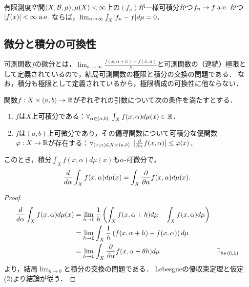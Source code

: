 \documentclass[uplatex, dvipdfmx]{jsreport}
\begin{document}
\begin{theorem}[Vitali]
    有限測度空間$(X,\mathcal{B},\mu),\mu(X)<\infty$上の$(f_n)$が一様可積分かつ$f_n\to f\;\mathrm{a.e.}\;$かつ$\lvert f(x)\rvert<\infty\;\mathrm{a.e.}\;$ならば，$\lim_{n\to\infty}\int_X\lvert f_n-f\rvert d\mu=0$．
\end{theorem}

\subsection{微分と積分の可換性}

\begin{tcolorbox}[colframe=ForestGreen, colback=ForestGreen!10!white,breakable,colbacktitle=ForestGreen!40!white,coltitle=black,fonttitle=\bfseries\sffamily,
title=]
    可測関数$f$の微分とは，$\lim_{h\to\infty}\frac{f(x,\alpha+h)-f(x,\alpha)}{h}$と可測関数の（連続）極限として定義されているので，結局可測関数の極限と積分の交換の問題である．
    なお，積分も極限として定義されているから，極限構成の可換性に他ならない．
\end{tcolorbox}

\begin{theorem}
    関数$f:X\times(a,b)\to\mathbb{R}$がぞれぞれの引数について次の条件を満たすとする．
    \begin{enumerate}
        \item $f$は$X$上可積分である：$\forall_{\alpha\in(a,b)}\;\int_Xf(x,\alpha)d\mu(x)\in\mathbb{R}$．
        \item $f$は$(a,b)$上可微分であり，その偏導関数について可積分な優関数$\varphi:X\to\mathbb{R}$が存在する：$\forall_{(x,\alpha)\in X\times(a,b)}\;\left|\frac{\partial }{\partial \alpha}f(x,\alpha)\right|\le \varphi(x)$．
    \end{enumerate}
    このとき，積分$\int_Xf(x,\alpha)d\mu(x)$も$\alpha$-可微分で，
    \[\frac{d }{d \alpha}\int_Xf(x,\alpha)d\mu(x)=\int_X\frac{\partial }{\partial \alpha}f(x,\alpha)d\mu(x).\]
\end{theorem}
\begin{proof}
    \begin{align*}
        \frac{d }{d \alpha}\int_Xf(x,\alpha)d\mu(x)&=\lim_{h\to0}\frac{1}{h}\left(\int_Xf(x,\alpha+h)d\mu-\int_Xf(x,\alpha)d\mu\right)\\
        &=\lim_{h\to0}\int_X\frac{1}{h}\left(f(x,\alpha+h)-f(x,\alpha)\right)d\mu\\
        &=\lim_{h\to0}\int_X\frac{\partial }{\partial \alpha}f(x,\alpha+\theta h)d\mu&\exists_{\theta\in(0,1)}
    \end{align*}
    より，結局$\lim_{h\to0}$と積分の交換の問題である．
    Lebesgueの優収束定理と仮定(2)より結論が従う．
\end{proof}
\end{document}
